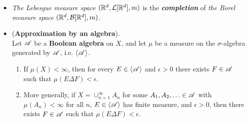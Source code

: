 \documentclass[11pt]{article}
\begin{document}
\begin{itemize}
\item \begin{remark}
\emph{The Lebesgue measure space} $({\mathbb R}^d, {\mathcal L}[{\mathbb R}^d], m)$ is the \emph{\textbf{completion}} of \emph{the Borel measure space} $({\mathbb R}^d, {\mathcal B}[{\mathbb R}^d], m)$.
\end{remark}

\item \begin{proposition} (\textbf{Approximation by an algebra}). \\
Let ${\mathscr A}$ be a \textbf{Boolean algebra} on $X$, and let $\mu$ be a measure on the $\sigma$-algebra generated by ${\mathscr A}$, i.e. $\langle {\mathscr A} \rangle$.
\begin{enumerate}
\item If $\mu(X) < \infty$,  then for every $E \in \langle {\mathscr A} \rangle$ and $\epsilon > 0$ there exists $F \in {\mathscr A}$ such that $\mu(E \Delta F) < \epsilon$.
\item More generally, if $X = \cup_{n=1}^{\infty} A_n$ for some $A_1, A_2, \ldots \in {\mathscr A}$ with $\mu(A_n) < \infty$ for all $n$, $E \in \langle {\mathscr A} \rangle$ has finite measure, and $\epsilon > 0$,  then there exists $F \in {\mathscr A}$ such that $\mu(E \Delta F) < \epsilon$.
\end{enumerate}
\end{proposition}
\end{itemize}
\end{document}
